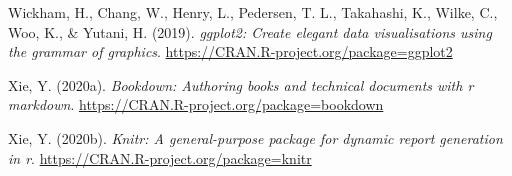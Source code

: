 \documentclass[
  a4paper,11pt,twoside,onecolumn,openright,final,oldfontcommands]{memoir}
\newlength{\cslhangindent}
\newlength{\cslentryspacingunit} %
\newenvironment{CSLReferences}[2] %
 {%
  \setlength{\parindent}{0pt}
  \ifodd #1
  \let\oldpar\par
  \def\par{\hangindent=\cslhangindent\oldpar}
  \fi
  \setlength{\parskip}{#2\cslentryspacingunit}
 }%
 {}
\theoremstyle{definition}
\theoremstyle{definition}
\theoremstyle{definition}
\theoremstyle{definition}
\theoremstyle{remark}
\begin{document}
\begin{CSLReferences}{1}{0}
\leavevmode{}%
Wickham, H., Chang, W., Henry, L., Pedersen, T. L., Takahashi, K., Wilke, C., Woo, K., \& Yutani, H. (2019). \emph{ggplot2: Create elegant data visualisations using the grammar of graphics}. \url{https://CRAN.R-project.org/package=ggplot2}

\leavevmode{}%
Xie, Y. (2020a). \emph{Bookdown: Authoring books and technical documents with r markdown}. \url{https://CRAN.R-project.org/package=bookdown}

\leavevmode{}%
Xie, Y. (2020b). \emph{Knitr: A general-purpose package for dynamic report generation in r}. \url{https://CRAN.R-project.org/package=knitr}

\end{CSLReferences}
\end{document}
